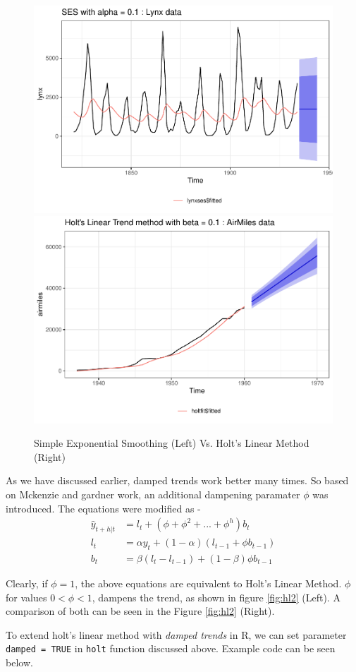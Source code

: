 \documentclass[
]{book}
\begin{document}
\begin{figure}

{\centering \includegraphics[width=0.49\linewidth]{DauR_files/figure-latex/ses1-1} \includegraphics[width=0.49\linewidth]{DauR_files/figure-latex/ses1-2} 

}

\caption{Simple Exponential Smoothing (Left) Vs. Holt's Linear Method (Right)}\label{fig:ses1}
\end{figure}

As we have discussed earlier, damped trends work better many times. So based on Mckenzie and gardner work, an additional dampening paramater \(\phi\) was introduced. The equations were modified as -
\[
\begin{aligned}
\hat{y}_{t+h|t} &= l_t + (\phi + \phi^2 + ... + \phi^h)b_t \\
l_t &= \alpha y_t + (1-\alpha)(l_{t-1} + \phi b_{t-1}) \\
b_t &= \beta(l_t - l_{t-1}) + (1-\beta)\phi b_{t-1}
\end{aligned}
\]

Clearly, if \(\phi = 1\), the above equations are equivalent to Holt's Linear Method. \(\phi\) for values \(0 < \phi < 1\), dampens the trend, as shown in figure \ref{fig:hl2} (Left). A comparison of both can be seen in the Figure \ref{fig:hl2} (Right).

To extend holt's linear method with \emph{damped trends} in R, we can set parameter \texttt{damped\ =\ TRUE} in \texttt{holt} function discussed above. Example code can be seen below.
\end{document}
